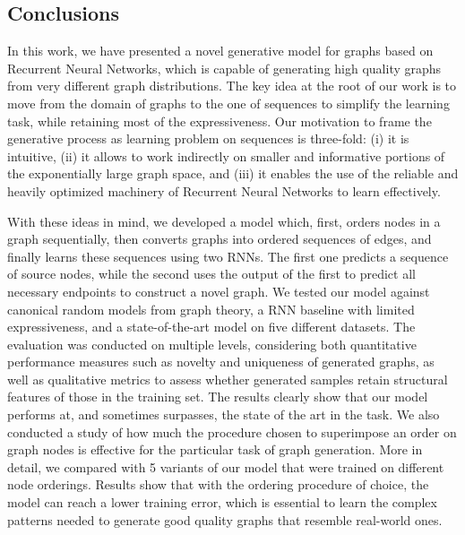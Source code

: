 \subsection{Conclusions}
In this work, we have presented a novel generative model for graphs based on Recurrent Neural Networks, which is capable of generating high quality graphs from very different graph distributions. The key idea at the root of our work is to move from the domain of graphs to the one of sequences to simplify the learning task, while retaining most of the expressiveness. Our motivation to frame the generative process as learning problem on sequences is three-fold: (i) it is intuitive, (ii) it allows to work indirectly on smaller and informative portions of the exponentially large graph space, and (iii) it enables the use of the reliable and heavily optimized machinery of Recurrent Neural Networks to learn effectively.

With these ideas in mind, we developed a model which, first, orders nodes in a graph sequentially, then converts graphs into ordered sequences of edges, and finally learns these sequences using two RNNs. The first one predicts a sequence of source nodes, while the second uses the output of the first to predict all necessary endpoints to construct a novel graph. We tested our model against canonical random models from graph theory, a RNN baseline with limited expressiveness, and a state-of-the-art model on five different datasets. The evaluation was conducted on multiple levels, considering both quantitative performance measures such as novelty and uniqueness of generated graphs, as well as qualitative metrics to assess whether generated samples retain structural features of those in the training set. The results clearly show that our model performs at, and sometimes surpasses, the state of the art in the task.
We also conducted a study of how much the procedure chosen to superimpose an order on graph nodes is effective for the particular task of graph generation. More in detail, we compared with 5 variants of our model that were trained on different node orderings. Results show that with the ordering procedure of choice, the model can reach a lower training error, which is essential to learn the complex patterns needed to generate good quality graphs that resemble real-world ones.

